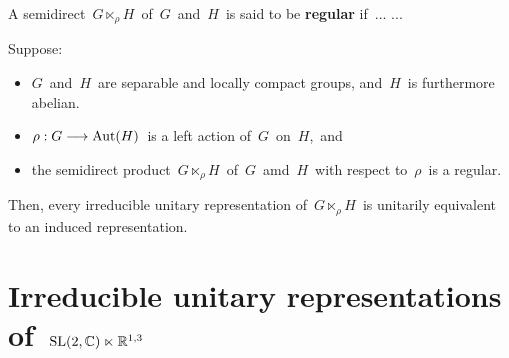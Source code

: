 

\vskip 0.5cm
\begin{definition}
\mbox{}
\vskip 0.1cm
\noindent
A semidirect
\,$G \ltimes_{\rho}\! H$\, of \,$G$\, and \,$H$\,
is said to be \textbf{regular} if \,... ...
\end{definition}


\vskip 0.5cm
\begin{theorem}
\mbox{}
\vskip 0.1cm
\noindent
Suppose:
\begin{itemize}
\item
	$G$\, and \,$H$\, are separable and locally compact groups, and
	\,$H$\, is furthermore abelian.
\item
	$\rho : G \longrightarrow \textnormal{Aut}(H)$\,
	is a left action of \,$G$\, on \,$H$,\, and
\item
	the semidirect product
	\,$G \ltimes_{\rho}\! H$\, of \,$G$\, amd \,$H$\,
	with respect to \,$\rho$\,
	is a regular.
\end{itemize}
Then, every irreducible unitary representation of
\,$G \ltimes_{\rho}\! H$\,
is unitarily equivalent to an induced representation.
\end{theorem}


\vskip 1.0cm
\section{Irreducible unitary representations of \,$\textnormal{SL}(2,\mathbb{C}) \ltimes \mathbb{R}^{1,3}$}


